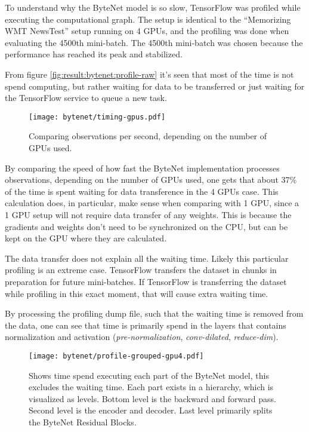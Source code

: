 To understand why the ByteNet model is so slow, TensorFlow was profiled while executing the computational graph. The setup is identical to the ``Memorizing WMT NewsTest'' setup running on 4 GPUs, and the profiling was done when evaluating the 4500th mini-batch. The 4500th mini-batch was chosen because the performance has reached its peak and stabilized.

From figure \ref{fig:result:bytenet:profile-raw} it's seen that most of the time is not spend computing, but rather waiting for data to be transferred or just waiting for the TensorFlow service to queue a new task.

\begin{figure}[h]
    \centering
    \texttt{[image: bytenet/timing-gpus.pdf]}
    \caption{Comparing observations per second, depending on the number of GPUs used.}
    \label{fig:result:bytenet:timing-gpus}
\end{figure}

By comparing the speed of how fast the ByteNet implementation processes observations, depending on the number of GPUs used, one gets that about 37\% of the time is spent waiting for data transference in the 4 GPUs case. This calculation does, in particular, make sense when comparing with 1 GPU, since a 1 GPU setup will not require data transfer of any weights. This is because the gradients and weights don't need to be synchronized on the CPU, but can be kept on the GPU where they are calculated.

The data transfer does not explain all the waiting time. Likely this particular profiling is an extreme case. TensorFlow transfers the dataset in chunks in preparation for future mini-batches. If TensorFlow is transferring the dataset while profiling in this exact moment, that will cause extra waiting time.

By processing the profiling dump file, such that the waiting time is removed from the data, one can see that time is primarily spend in the layers that contains normalization and activation (\textit{pre-normalization}, \textit{conv-dilated}, \textit{reduce-dim}).

\begin{figure}[h]
    \centering
    \texttt{[image: bytenet/profile-grouped-gpu4.pdf]}
    \caption{Shows time spend executing each part of the ByteNet model, this excludes the waiting time. Each part exists in a hierarchy, which is visualized as levels. Bottom level is the backward and forward pass. Second level is the encoder and decoder. Last level primarily splits the ByteNet Residual Blocks.}
    \label{fig:result:bytenet:profile-grouped}
\end{figure}


